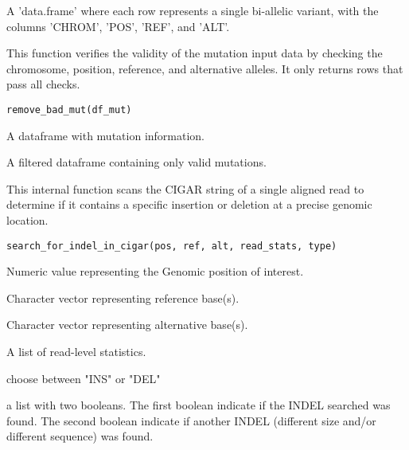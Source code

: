 \documentclass[a4paper]{book}
\begin{document}
%
\begin{Value}
A 'data.frame' where each row represents a single bi-allelic variant, with the columns 'CHROM', 'POS', 'REF', and 'ALT'.
\end{Value}
%
\begin{Description}
This function verifies the validity of the mutation input data by checking the chromosome, position,
reference, and alternative alleles. It only returns rows that pass all checks.
\end{Description}
%
\begin{Usage}
\begin{verbatim}
remove_bad_mut(df_mut)
\end{verbatim}
\end{Usage}
%
\begin{Arguments}
\begin{ldescription}
\item[\code{df\_mut}] A dataframe with mutation information.
\end{ldescription}
\end{Arguments}
%
\begin{Value}
A filtered dataframe containing only valid mutations.
\end{Value}
%
\begin{Description}
This internal function scans the CIGAR string of a single aligned read to
determine if it contains a specific insertion or deletion at a precise genomic location.
\end{Description}
%
\begin{Usage}
\begin{verbatim}
search_for_indel_in_cigar(pos, ref, alt, read_stats, type)
\end{verbatim}
\end{Usage}
%
\begin{Arguments}
\begin{ldescription}
\item[\code{pos}] Numeric value representing the Genomic position of interest.

\item[\code{ref}] Character vector representing reference base(s).

\item[\code{alt}] Character vector representing alternative base(s).

\item[\code{read\_stats}] A list of read-level statistics.

\item[\code{type}] choose between "INS" or "DEL"
\end{ldescription}
\end{Arguments}
%
\begin{Value}
a list with two booleans. The first boolean indicate if the INDEL searched was found. The second boolean
indicate if another INDEL (different size and/or different sequence) was found.
\end{Value}
\printindex{}
\end{document}
